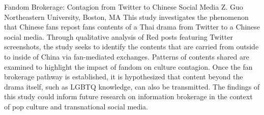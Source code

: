 
    \begin{abstract_online}{Fandom Brokerage: Contagion from Twitter to Chinese Social Media}{%
        Z. Guo}{%
        }{%
        Northeastern University, Boston, MA}
    This study investigates the phenomenon that Chinese fans repost fans contents of a Thai drama from Twitter to a Chinese social media. Through qualitative analysis of Red posts featuring Twitter screenshots, the study seeks to identify the contents that are carried from outside to inside of China via fan-mediated exchanges. Patterns of contents shared are examined to highlight the impact of fandom on culture contagion. Once the fan brokerage pathway is established, it is hypothesized that content beyond the drama itself, such as LGBTQ knowledge, can also be transmitted. The findings of this study could inform future research on information brokerage in the context of pop culture and transnational social media. 
    
    \end{abstract_online}
    
